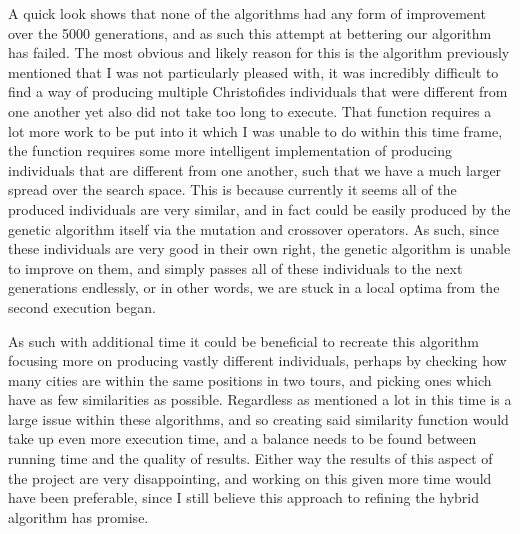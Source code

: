 \documentclass[11pt,a4paper,titlepage]{article}
\begin{document}
A quick look shows that none of the algorithms had any form of improvement over the 5000 generations, and as such this attempt at bettering our algorithm has failed. The most obvious and likely reason for this is the algorithm previously mentioned that I was not particularly pleased with, it was incredibly difficult to find a way of producing multiple Christofides individuals that were different from one another yet also did not take too long to execute. That function requires a lot more work to be put into it which I was unable to do within this time frame, the function requires some more intelligent implementation of producing individuals that are different from one another, such that we have a much larger spread over the search space. This is because currently it seems all of the produced individuals are very similar, and in fact could be easily produced by the genetic algorithm itself via the mutation and crossover operators. As such, since these individuals are very good in their own right, the genetic algorithm is unable to improve on them, and simply passes all of these individuals to the next generations endlessly, or in other words, we are stuck in a local optima from the second execution began.

As such with additional time it could be beneficial to recreate this algorithm focusing more on producing vastly different individuals, perhaps by checking how many cities are within the same positions in two tours, and picking ones which have as few similarities as possible. Regardless as mentioned a lot in this time is a large issue within these algorithms, and so creating said similarity function would take up even more execution time, and a balance needs to be found between running time and the quality of results. Either way the results of this aspect of the project are very disappointing, and working on this given more time would have been preferable, since I still believe this approach to refining the hybrid algorithm has promise.
\end{document}
